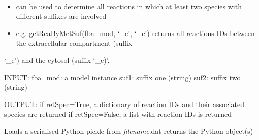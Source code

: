 \documentclass[a4paper,11pt,english]{sphinxmanual}
\begin{document}

\begin{fulllineitems}
\label{modules_doc:cbmpy.CBTools.getReaByMetSuf}~\begin{itemize}
\item {} 
can be used to determine all reactions in which at least two species with different suffixes are involved

\item {} 
e.g. getReaByMetSuf(fba\_mod, `\_e', `\_c') returns all reactions IDs between the extracellular compartment (suffix

\end{itemize}

`\_e') and the cytosol (suffix `\_c)'.

INPUT:
fba\_mod: a model instance
suf1: suffix one (string)
suf2: suffix two (string)

OUTPUT:
if retSpec=True, a dictionary of reaction IDs and their associated species are returned
if retSpec=False, a list with reaction IDs is returned

\end{fulllineitems}


\begin{fulllineitems}
\label{modules_doc:cbmpy.CBTools.loadObj}
Loads a serialised Python pickle from \emph{filename}.dat returns the Python object(s)

\end{fulllineitems}

\end{document}
